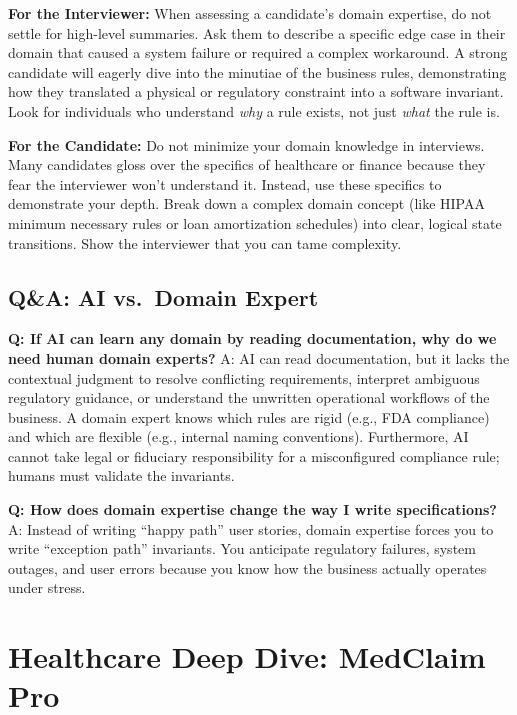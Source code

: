 \documentclass[
  11pt,
  openany,
  oneside]{book}
\renewenvironment{quote}{\begin{customquote}}{\end{customquote}}
\begin{document}
\begin{quote}
\textbf{For the Interviewer:} When assessing a candidate's domain
expertise, do not settle for high-level summaries. Ask them to describe
a specific edge case in their domain that caused a system failure or
required a complex workaround. A strong candidate will eagerly dive into
the minutiae of the business rules, demonstrating how they translated a
physical or regulatory constraint into a software invariant. Look for
individuals who understand \emph{why} a rule exists, not just
\emph{what} the rule is.
\end{quote}

\begin{quote}
\textbf{For the Candidate:} Do not minimize your domain knowledge in
interviews. Many candidates gloss over the specifics of healthcare or
finance because they fear the interviewer won't understand it. Instead,
use these specifics to demonstrate your depth. Break down a complex
domain concept (like HIPAA minimum necessary rules or loan amortization
schedules) into clear, logical state transitions. Show the interviewer
that you can tame complexity.
\end{quote}

\subsection{Q\&A: AI vs.~Domain Expert}\label{qa-ai-vs.-domain-expert}

\textbf{Q: If AI can learn any domain by reading documentation, why do
we need human domain experts?} A: AI can read documentation, but it
lacks the contextual judgment to resolve conflicting requirements,
interpret ambiguous regulatory guidance, or understand the unwritten
operational workflows of the business. A domain expert knows which rules
are rigid (e.g., FDA compliance) and which are flexible (e.g., internal
naming conventions). Furthermore, AI cannot take legal or fiduciary
responsibility for a misconfigured compliance rule; humans must validate
the invariants.

\textbf{Q: How does domain expertise change the way I write
specifications?} A: Instead of writing ``happy path'' user stories,
domain expertise forces you to write ``exception path'' invariants. You
anticipate regulatory failures, system outages, and user errors because
you know how the business actually operates under stress.

\bigskip

\section{Healthcare Deep Dive: MedClaim
Pro}\label{healthcare-deep-dive-medclaim-pro}
\end{document}
